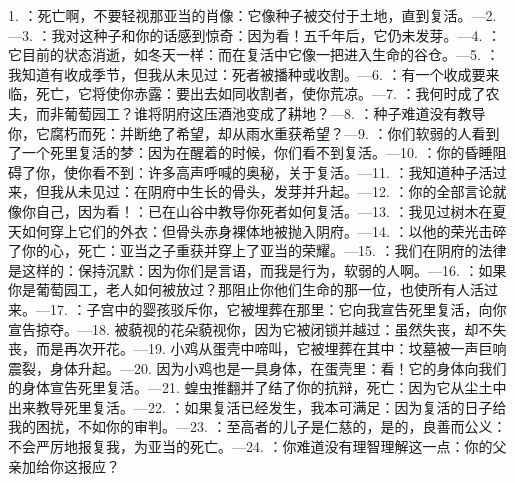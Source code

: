 1. ：死亡啊，不要轻视那亚当的肖像：它像种子被交付于土地，直到复活。—\newline{}2. —\newline{}3. ：我对这种子和你的话感到惊奇：因为看！五千年后，它仍未发芽。—\newline{}4. ：它目前的状态消逝，如冬天一样：而在复活中它像一把进入生命的谷仓。—\newline{}5. ：我知道有收成季节，但我从未见过：死者被播种或收割。—\newline{}6. ：有一个收成要来临，死亡，它将使你赤露：要出去如同收割者，使你荒凉。—\newline{}7. ：我何时成了农夫，而非葡萄园工？谁将阴府这压酒池变成了耕地？—\newline{}8. ：种子难道没有教导你，它腐朽而死：并断绝了希望，却从雨水重获希望？—\newline{}9. ：你们软弱的人看到了一个死里复活的梦：因为在醒着的时候，你们看不到复活。—\newline{}10. ：你的昏睡阻碍了你，使你看不到：许多高声呼喊的奥秘，关于复活。—\newline{}11. ：我知道种子活过来，但我从未见过：在阴府中生长的骨头，发芽并升起。—\newline{}12. ：你的全部言论就像你自己，因为看！：已在山谷中教导你死者如何复活。—\newline{}13. ：我见过树木在夏天如何穿上它们的外衣：但骨头赤身裸体地被抛入阴府。—\newline{}14. ：以他的荣光击碎了你的心，死亡：亚当之子重获并穿上了亚当的荣耀。—\newline{}15. ：我们在阴府的法律是这样的：保持沉默：因为你们是言语，而我是行为，软弱的人啊。—\newline{}16. ：如果你是葡萄园工，老人如何被放过？那阻止你他们生命的那一位，也使所有人活过来。—\newline{}17. ：子宫中的婴孩驳斥你，它被埋葬在那里：它向我宣告死里复活，向你宣告掠夺。—\newline{}18. 被藐视的花朵藐视你，因为它被闭锁并越过：虽然失丧，却不失丧，而是再次开花。—\newline{}19. 小鸡从蛋壳中啼叫，它被埋葬在其中：坟墓被一声巨响震裂，身体升起。—\newline{}20. 因为小鸡也是一具身体，在蛋壳里：看！它的身体向我们的身体宣告死里复活。—\newline{}21. 蝗虫推翻并了结了你的抗辩，死亡：因为它从尘土中出来教导死里复活。—\newline{}22. ：如果复活已经发生，我本可满足：因为复活的日子给我的困扰，不如你的审判。—\newline{}23. ：至高者的儿子是仁慈的，是的，良善而公义：不会严厉地报复我，为亚当的死亡。—\newline{}24. ：你难道没有理智理解这一点：你的父亲加给你这报应？\par

